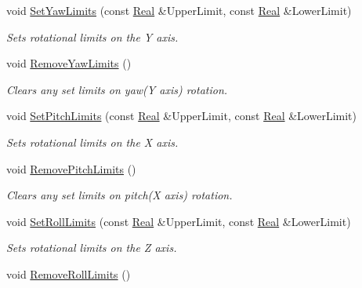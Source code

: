 \begin{DoxyCompactItemize}
void \hyperlink{classphys_1_1CameraController_a0c19fba402f176361aea139ead5a9a40}{SetYawLimits} (const \hyperlink{namespacephys_af7eb897198d265b8e868f45240230d5f}{Real} \&UpperLimit, const \hyperlink{namespacephys_af7eb897198d265b8e868f45240230d5f}{Real} \&LowerLimit)
\begin{DoxyCompactList}\small\item\em Sets rotational limits on the Y axis. \item\end{DoxyCompactList}\item 
\hypertarget{classphys_1_1CameraController_a356fa13a243b5f3645576b9b857ce085}{
void \hyperlink{classphys_1_1CameraController_a356fa13a243b5f3645576b9b857ce085}{RemoveYawLimits} ()}
\label{de/d70/classphys_1_1CameraController_a356fa13a243b5f3645576b9b857ce085}

\begin{DoxyCompactList}\small\item\em Clears any set limits on yaw(Y axis) rotation. \item\end{DoxyCompactList}\item 
void \hyperlink{classphys_1_1CameraController_a9ca0500582f46a20189cdc39555b79b3}{SetPitchLimits} (const \hyperlink{namespacephys_af7eb897198d265b8e868f45240230d5f}{Real} \&UpperLimit, const \hyperlink{namespacephys_af7eb897198d265b8e868f45240230d5f}{Real} \&LowerLimit)
\begin{DoxyCompactList}\small\item\em Sets rotational limits on the X axis. \item\end{DoxyCompactList}\item 
\hypertarget{classphys_1_1CameraController_a19478dd2688262f9652410a630dfa731}{
void \hyperlink{classphys_1_1CameraController_a19478dd2688262f9652410a630dfa731}{RemovePitchLimits} ()}
\label{de/d70/classphys_1_1CameraController_a19478dd2688262f9652410a630dfa731}

\begin{DoxyCompactList}\small\item\em Clears any set limits on pitch(X axis) rotation. \item\end{DoxyCompactList}\item 
void \hyperlink{classphys_1_1CameraController_a047f16cf47f9648472db34fc8337bd45}{SetRollLimits} (const \hyperlink{namespacephys_af7eb897198d265b8e868f45240230d5f}{Real} \&UpperLimit, const \hyperlink{namespacephys_af7eb897198d265b8e868f45240230d5f}{Real} \&LowerLimit)
\begin{DoxyCompactList}\small\item\em Sets rotational limits on the Z axis. \item\end{DoxyCompactList}\item 
\hypertarget{classphys_1_1CameraController_ad2ea07b9eb9c4ebc1d753a7376c307b3}{
void \hyperlink{classphys_1_1CameraController_ad2ea07b9eb9c4ebc1d753a7376c307b3}{RemoveRollLimits} ()}
\label{de/d70/classphys_1_1CameraController_ad2ea07b9eb9c4ebc1d753a7376c307b3}


\end{DoxyCompactItemize}
